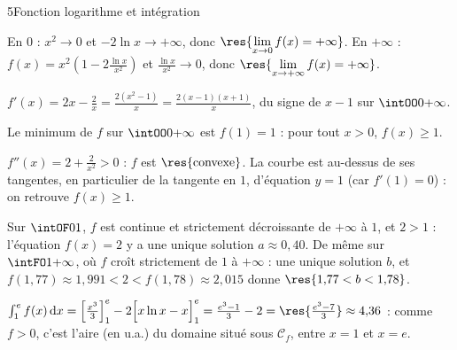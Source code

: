 \begin{corrigeBac}{5}{Fonction logarithme et intégration}
\begin{questions}
  \item En $0$ : $x^{2}\to0$ et $-2\ln x\to+\infty$, donc $\res{\lim\limits_{x\to0}f(x)=+\infty}$. En $+\infty$ :
    $f(x)=x^{2}\left(1-2\frac{\ln x}{x^{2}}\right)$ et $\frac{\ln x}{x^{2}}\to0$, donc $\res{\lim\limits_{x\to+\infty}f(x)=+\infty}$. \pts{1 pt}
  \item $f'(x)=2x-\frac2x=\frac{2(x^{2}-1)}{x}=\frac{2(x-1)(x+1)}{x}$, du signe de $x-1$ sur $\intOO0{+\infty}$.
\begin{center}
\begin{tableau}
\end{tableau}
\end{center}
    \pts{1 pt}
  \item Le minimum de $f$ sur $\intOO0{+\infty}$ est $f(1)=1$ : pour tout $x>0$, $f(x)\geq1$. 
  \item $f''(x)=2+\frac2{x^{2}}>0$ : $f$ est $\res{\text{convexe}}$. La courbe est au-dessus de ses tangentes, en particulier de la
    tangente en $1$, d'équation $y=1$ (car $f'(1)=0$) : on retrouve $f(x)\geq1$. 
\end{questions}
\begin{questions}[resume]
  \item Sur $\intOF01$, $f$ est continue et strictement décroissante de $+\infty$ à $1$, et $2>1$ : l'équation $f(x)=2$ y a une unique
    solution $a\approx0{,}40$. De même sur $\intFO1{+\infty}$, où $f$ croît strictement de $1$ à $+\infty$ : une unique solution $b$, et
    $f(1{,}77)\approx1{,}991<2<f(1{,}78)\approx2{,}015$ donne $\res{1{,}77<b<1{,}78}$. \pts{1 pt}
  \item $\int_1^{e}f(x)\,\mathrm{d}x=\left[\frac{x^{3}}{3}\right]_1^{e}-2\Big[x\ln x-x\Big]_1^{e}=\frac{e^{3}-1}{3}-2
    =\res{\tfrac{e^{3}-7}{3}}\approx4{,}36$ : comme $f>0$, c'est l'aire (en u.a.) du domaine situé sous $\mathcal{C}_f$, entre $x=1$ et
    $x=e$. \pts{1 pt}
\end{questions}
\end{corrigeBac}
